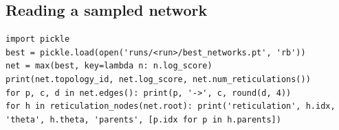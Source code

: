 \subsection{Reading a sampled network}
\begin{lstlisting}
import pickle
best = pickle.load(open('runs/<run>/best_networks.pt', 'rb'))
net = max(best, key=lambda n: n.log_score)
print(net.topology_id, net.log_score, net.num_reticulations())
for p, c, d in net.edges(): print(p, '->', c, round(d, 4))
for h in reticulation_nodes(net.root): print('reticulation', h.idx, 'theta', h.theta, 'parents', [p.idx for p in h.parents])
\end{lstlisting}
\clearpage
